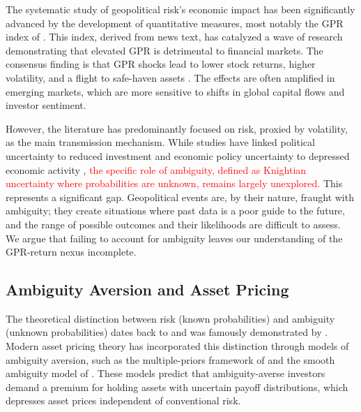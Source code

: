 \documentclass[preprint,12pt,authoryear]{elsarticle}
\begin{document}
The systematic study of geopolitical risk's economic impact has been significantly advanced by the development of quantitative measures, most notably the GPR index of \citet{Caldara2022}. This index, derived from news text, has catalyzed a wave of research demonstrating that elevated GPR is detrimental to financial markets. The consensus finding is that GPR shocks lead to lower stock returns, higher volatility, and a flight to safe-haven assets \citep{Caldara2022}. The effects are often amplified in emerging markets, which are more sensitive to shifts in global capital flows and investor sentiment.

However, the literature has predominantly focused on risk, proxied by volatility, as the main transmission mechanism. While studies have linked political uncertainty to reduced investment \citep{Pastor2013} and economic policy uncertainty to depressed economic activity \citep{Baker2016}, \textcolor{red}{the specific role of ambiguity, defined as Knightian uncertainty where probabilities are unknown, remains largely unexplored.} This represents a significant gap. Geopolitical events are, by their nature, fraught with ambiguity; they create situations where past data is a poor guide to the future, and the range of possible outcomes and their likelihoods are difficult to assess. We argue that failing to account for ambiguity leaves our understanding of the GPR-return nexus incomplete.

\subsection{Ambiguity Aversion and Asset Pricing}

The theoretical distinction between risk (known probabilities) and ambiguity (unknown probabilities) dates back to \citet{Knight1921} and was famously demonstrated by \citet{Ellsberg1961}. Modern asset pricing theory has incorporated this distinction through models of ambiguity aversion, such as the multiple-priors framework of \citet{Gilboa1989} and the smooth ambiguity model of \citet{Klibanoff2005}. These models predict that ambiguity-averse investors demand a premium for holding assets with uncertain payoff distributions, which depresses asset prices independent of conventional risk.
\end{document}
